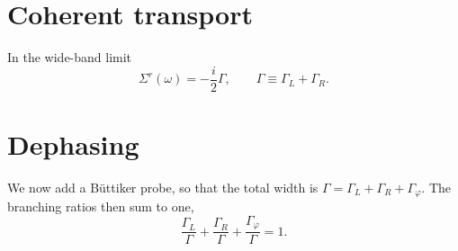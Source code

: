 \documentclass{article}
\begin{document}
\section{Coherent transport}
In the wide-band limit
\begin{equation}
\Sigma^r(\omega) = -\frac{i}{2}\Gamma, \qquad \Gamma \equiv \Gamma_L + \Gamma_R .
\label{eq:se}
\end{equation}
\section{Dephasing}
We now add a B\"uttiker probe, so that the total width is $\Gamma = \Gamma_L + \Gamma_R + \Gamma_\varphi$.
The branching ratios then sum to one,
\begin{equation}
\frac{\Gamma_L}{\Gamma} + \frac{\Gamma_R}{\Gamma} + \frac{\Gamma_\varphi}{\Gamma} = 1 .
\label{eq:branch}
\end{equation}
\end{document}
